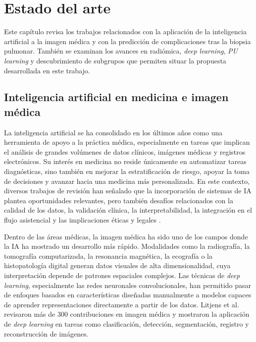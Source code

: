 \chapter{Estado del arte}\label{chap:estado_del_arte}

Este capítulo revisa los trabajos relacionados con la aplicación de la inteligencia artificial a la imagen médica y con la predicción de complicaciones tras la biopsia pulmonar. También se examinan los avances en radiómica, \textit{deep learning}, \textit{PU learning} y descubrimiento de subgrupos que permiten situar la propuesta desarrollada en este trabajo.

\section{Inteligencia artificial en medicina e imagen médica}

La inteligencia artificial se ha consolidado en los últimos años como una herramienta de apoyo a la práctica médica, especialmente en tareas que implican el análisis de grandes volúmenes de datos clínicos, imágenes médicas y registros electrónicos. Su interés en medicina no reside únicamente en automatizar tareas diagnósticas, sino también en mejorar la estratificación de riesgo, apoyar la toma de decisiones y avanzar hacia una medicina más personalizada. En este contexto, diversos trabajos de revisión han señalado que la incorporación de sistemas de IA plantea oportunidades relevantes, pero también desafíos relacionados con la calidad de los datos, la validación clínica, la interpretabilidad, la integración en el flujo asistencial y las implicaciones éticas y legales \cite{Yu2018,Topol2019}.

Dentro de las áreas médicas, la imagen médica ha sido uno de los campos donde la IA ha mostrado un desarrollo más rápido. Modalidades como la radiografía, la tomografía computarizada, la resonancia magnética, la ecografía o la histopatología digital generan datos visuales de alta dimensionalidad, cuya interpretación depende de patrones espaciales complejos. Las técnicas de \textit{deep learning}, especialmente las redes neuronales convolucionales, han permitido pasar de enfoques basados en características diseñadas manualmente a modelos capaces de aprender representaciones directamente a partir de los datos. Litjens et al. \cite{Litjens2017} revisaron más de 300 contribuciones en imagen médica y mostraron la aplicación de \textit{deep learning} en tareas como clasificación, detección, segmentación, registro y reconstrucción de imágenes.

